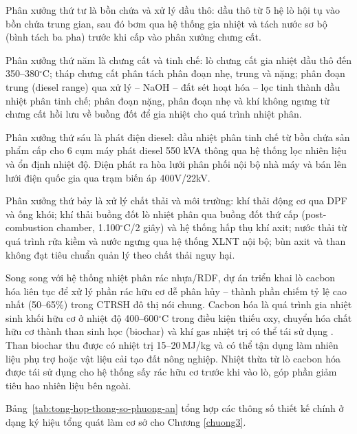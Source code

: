 \documentclass[../main.tex]{subfiles}
\begin{document}
Phân xưởng thứ tư là bồn chứa và xử lý dầu thô: dầu thô từ 5 hệ lò hội tụ vào bồn chứa trung gian, sau đó bơm qua hệ thống gia nhiệt và tách nước sơ bộ (bình tách ba pha) trước khi cấp vào phân xưởng chưng cất.

Phân xưởng thứ năm là chưng cất và tinh chế: lò chưng cất gia nhiệt dầu thô đến 350--380$^\circ\mathrm{C}$; tháp chưng cất phân tách phân đoạn nhẹ, trung và nặng; phân đoạn trung (diesel range) qua xử lý  -- NaOH -- đất sét hoạt hóa -- lọc tinh thành dầu nhiệt phân tinh chế; phân đoạn nặng, phân đoạn nhẹ và khí không ngưng từ chưng cất hồi lưu về buồng đốt để gia nhiệt cho quá trình nhiệt phân.

Phân xưởng thứ sáu là phát điện diesel: dầu nhiệt phân tinh chế từ bồn chứa sản phẩm cấp cho 6 cụm máy phát diesel 550 kVA thông qua hệ thống lọc nhiên liệu và ổn định nhiệt độ. Điện phát ra hòa lưới phân phối nội bộ nhà máy và bán lên lưới điện quốc gia qua trạm biến áp 400V/22kV.

Phân xưởng thứ bảy là xử lý chất thải và môi trường: khí thải động cơ qua DPF và ống khói; khí thải buồng đốt lò nhiệt phân qua buồng đốt thứ cấp (post-combustion chamber, 1.100$^\circ\mathrm{C}$/2 giây) và hệ thống hấp thụ khí axit; nước thải từ quá trình rửa kiềm và nước ngưng qua hệ thống XLNT nội bộ; bùn axit và than không đạt tiêu chuẩn quản lý theo chất thải nguy hại.

Song song với hệ thống nhiệt phân rác nhựa/RDF, dự án triển khai lò cacbon hóa liên tục để xử lý phần rác hữu cơ dễ phân hủy -- thành phần chiếm tỷ lệ cao nhất (50--65\%) trong CTRSH đô thị nói chung. Cacbon hóa là quá trình gia nhiệt sinh khối hữu cơ ở nhiệt độ 400--600$^\circ\mathrm{C}$ trong điều kiện thiếu oxy, chuyển hóa chất hữu cơ thành than sinh học (biochar) và khí gas nhiệt trị có thể tái sử dụng \cite{Bridgwater2012}. Than biochar thu được có nhiệt trị 15--20\,MJ/kg và có thể tận dụng làm nhiên liệu phụ trợ hoặc vật liệu cải tạo đất nông nghiệp. Nhiệt thừa từ lò cacbon hóa được tái sử dụng cho hệ thống sấy rác hữu cơ trước khi vào lò, góp phần giảm tiêu hao nhiên liệu bên ngoài.

Bảng~\ref{tab:tong-hop-thong-so-phuong-an} tổng hợp các thông số thiết kế chính ở dạng ký hiệu tổng quát làm cơ sở cho Chương \ref{chuong3}.
\end{document}
